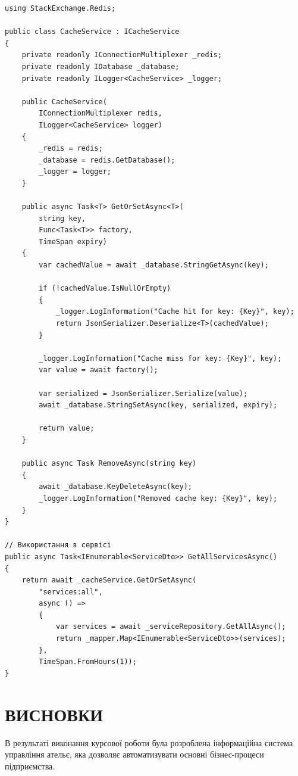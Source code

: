 \documentclass[14pt,a4paper]{extarticle}
\begin{document}
\begin{lstlisting}[language={[Sharp]C}, caption=Використання Redis для кешування, basicstyle=\small\ttfamily, breaklines=true, frame=single]
using StackExchange.Redis;

public class CacheService : ICacheService
{
    private readonly IConnectionMultiplexer _redis;
    private readonly IDatabase _database;
    private readonly ILogger<CacheService> _logger;
    
    public CacheService(
        IConnectionMultiplexer redis,
        ILogger<CacheService> logger)
    {
        _redis = redis;
        _database = redis.GetDatabase();
        _logger = logger;
    }
    
    public async Task<T> GetOrSetAsync<T>(
        string key,
        Func<Task<T>> factory,
        TimeSpan expiry)
    {
        var cachedValue = await _database.StringGetAsync(key);
        
        if (!cachedValue.IsNullOrEmpty)
        {
            _logger.LogInformation("Cache hit for key: {Key}", key);
            return JsonSerializer.Deserialize<T>(cachedValue);
        }
        
        _logger.LogInformation("Cache miss for key: {Key}", key);
        var value = await factory();
        
        var serialized = JsonSerializer.Serialize(value);
        await _database.StringSetAsync(key, serialized, expiry);
        
        return value;
    }
    
    public async Task RemoveAsync(string key)
    {
        await _database.KeyDeleteAsync(key);
        _logger.LogInformation("Removed cache key: {Key}", key);
    }
}

// Використання в сервісі
public async Task<IEnumerable<ServiceDto>> GetAllServicesAsync()
{
    return await _cacheService.GetOrSetAsync(
        "services:all",
        async () => 
        {
            var services = await _serviceRepository.GetAllAsync();
            return _mapper.Map<IEnumerable<ServiceDto>>(services);
        },
        TimeSpan.FromHours(1));
}
\end{lstlisting}

\newpage
\section{ВИСНОВКИ}

В результаті виконання курсової роботи була розроблена інформаційна система управління ательє, яка дозволяє автоматизувати основні бізнес-процеси підприємства.
\end{document}
